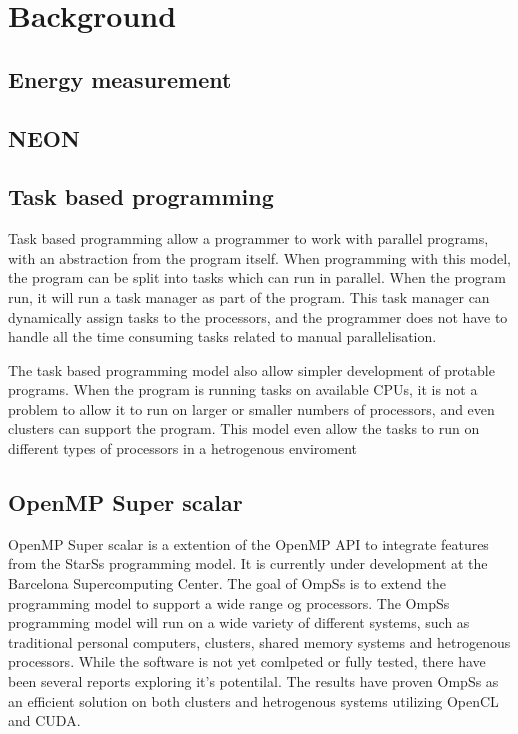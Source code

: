 \chapter[Background]{Background}

\section{Energy measurement}

\section{NEON}

\section{Task based programming}
Task based programming allow a programmer to work with parallel programs, with an abstraction from the program itself.
When programming with this model, the program can be split into tasks which can run in parallel.
When the program run, it will run a task manager as part of the program.
This task manager can dynamically assign tasks to the processors, and the programmer does not have to handle all the time consuming tasks related to manual parallelisation.

The task based programming model also allow simpler development of protable programs.
When the program is running tasks on available CPUs, it is not a problem to allow it to run on larger or smaller numbers of processors, and even clusters can support the program.
This model even allow the tasks to run on different types of processors in a hetrogenous enviroment   

\section[OmpSs]{OpenMP Super scalar}
OpenMP Super scalar is a extention of the OpenMP API to integrate features from the StarSs programming model.
It is currently under development at the Barcelona Supercomputing Center.
The goal of OmpSs is to extend the programming model to support a wide range og processors.
The OmpSs programming model will run on a wide variety of different systems, such as traditional personal computers, clusters, shared memory systems and hetrogenous processors.
While the software is not yet comlpeted or fully tested, there have been several reports exploring it's potentilal.
The results have proven OmpSs as an efficient solution on both clusters and hetrogenous systems utilizing OpenCL and CUDA.


